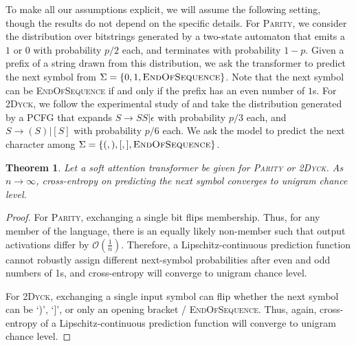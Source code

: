 \documentclass[11pt,a4paper]{article}
\newcounter{theorem}
\newtheorem{thm}[theorem]{Theorem}
\begin{document}
To make all our assumptions explicit, we will assume the following setting, though the results do not depend on the specific details.
For \textsc{Parity}, we consider the distribution over bitstrings generated by a two-state automaton that emits a $1$ or $0$ with probability $p/2$ each, and terminates with probability $1-p$.
Given a prefix of a string drawn from this distribution, we ask the transformer to predict the next symbol from $\Sigma = \{0, 1, \textsc{EndOfSequence}\}$.
Note that the next symbol can be \textsc{EndOfSequence} if and only if the prefix has an even number of $1$s.
For \textsc{2Dyck}, we follow the experimental study of \citet{skachkova2018closing} and take the distribution generated by a PCFG that expands $S \rightarrow SS | \epsilon$ with probability $p/3$ each, and $S  \rightarrow (S) | [S]$ with probability $p/6$ each.
We ask the model to predict the next character among $\Sigma = \{(,),[, ], \textsc{EndOfSequence}\}$. %

\begin{thm}
Let a soft attention transformer be given for \textsc{Parity} or \textsc{2Dyck}. %
As $n\rightarrow\infty$, cross-entropy on predicting the next symbol converges to unigram chance level.
\end{thm}

\begin{proof}
For \textsc{Parity}, exchanging a single bit flips membership.
Thus, for any member of the language, there is an equally likely non-member such that output activations differ by $\mathcal{O}(\frac{1}{n})$.
Therefore, a Lipschitz-continuous prediction function cannot robustly assign different next-symbol probabilities after even and odd numbers of 1s, and cross-entropy will converge to unigram chance level.

For \textsc{2Dyck}, exchanging a single input symbol can flip whether the next symbol can be `)', `]', or only an opening bracket / \textsc{EndOfSequence}.
Thus, again, cross-entropy of a Lipschitz-continuous prediction function will converge to unigram chance level.
\end{proof}
\end{document}
